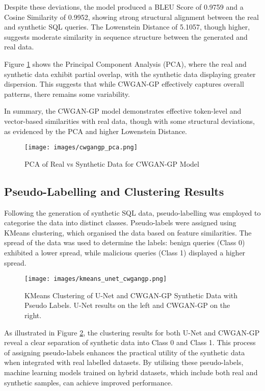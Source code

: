 \documentclass[journal]{IEEEtran}
\begin{document}
Despite these deviations, the model produced a BLEU Score of 0.9759 and a Cosine Similarity of 0.9952, showing strong structural alignment between the real and synthetic SQL queries. The Lowenstein Distance of 5.1057, though higher, suggests moderate similarity in sequence structure between the generated and real data.

Figure \ref{fig:pca_cwgan} shows the Principal Component Analysis (PCA), where the real and synthetic data exhibit partial overlap, with the synthetic data displaying greater dispersion. This suggests that while CWGAN-GP effectively captures overall patterns, there remains some variability.

In summary, the CWGAN-GP model demonstrates effective token-level and vector-based similarities with real data, though with some structural deviations, as evidenced by the PCA and higher Lowenstein Distance.

\begin{figure}[H]
    \centering
    \texttt{[image: images/cwgangp\_pca.png]}
    \caption{PCA of Real vs Synthetic Data for CWGAN-GP Model}
    \label{fig:pca_cwgan}
\end{figure}

\subsection{Pseudo-Labelling and Clustering Results}

Following the generation of synthetic SQL data, pseudo-labelling was employed to categorise the data into distinct classes. Pseudo-labels were assigned using KMeans clustering, which organised the data based on feature similarities. The spread of the data was used to determine the labels: benign queries (Class 0) exhibited a lower spread, while malicious queries (Class 1) displayed a higher spread.

\begin{figure}[H]
    \centering
    \texttt{[image: images/kmeans\_unet\_cwgangp.png]}
    \caption{KMeans Clustering of U-Net and CWGAN-GP Synthetic Data with Pseudo Labels. U-Net results on the left and CWGAN-GP on the right.}
    \label{fig:kmeans_pseudo}
\end{figure}

As illustrated in Figure \ref{fig:kmeans_pseudo}, the clustering results for both U-Net and CWGAN-GP reveal a clear separation of synthetic data into Class 0 and Class 1. This process of assigning pseudo-labels enhances the practical utility of the synthetic data when integrated with real labelled datasets. By utilising these pseudo-labels, machine learning models trained on hybrid datasets, which include both real and synthetic samples, can achieve improved performance.
\end{document}

